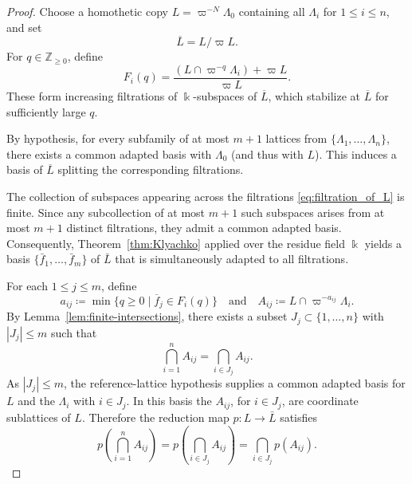 \documentclass[12pt]{amsart}
\theoremstyle{definition}
\theoremstyle{remark}
\newcommand{\Z}{\mathbb{Z}}
\def \Z{\mathbb{Z}}
\begin{document}
\begin{proof}%
Choose a homothetic copy $L = \varpi^{-N}\Lambda_0$ containing all $\Lambda_i$ for $1 \le i \le n$, and set $$\overline L = L/\varpi L.$$ For $q \in \Z_{\geq 0}$, define
\begin{equation}
    \label{eq:filtration_of_L}
    F_i(q) = \frac{(L \cap \varpi^{-q}\Lambda_i) + \varpi L}{\varpi L}.
\end{equation}
These form increasing filtrations of $\Bbbk$-subspaces of $\overline L$, which stabilize at $\overline L$ for sufficiently large $q$.

By hypothesis, for every subfamily of at most $m+1$ lattices from $\{\Lambda_1, \dots, \Lambda_n\}$, there exists a common adapted basis with $\Lambda_0$ (and thus with $L$). This induces a basis of $\overline L$ splitting the corresponding filtrations. 

The collection of subspaces appearing across the filtrations \eqref{eq:filtration_of_L} is finite. Since any subcollection of at most $m+1$ such subspaces arises from at most $m+1$ distinct filtrations, they admit a common adapted basis. Consequently, Theorem~\ref{thm:Klyachko} applied over the residue field $\Bbbk$ yields a basis $\{\bar{f}_1, \dots, \bar{f}_m\}$ of $\bar{L}$ that is simultaneously adapted to all filtrations.

For each $1 \le j \le m$, define
\[
    a_{ij} \coloneqq \min\{q \geq 0 \mid \overline f_j \in F_i(q)\} \quad \text{and} \quad A_{ij} \coloneqq L \cap \varpi^{-a_{ij}}\Lambda_i.
\]
By Lemma~\ref{lem:finite-intersections}, there exists a subset $J_j \subset \{1, \dots, n\}$ with $|J_j| \leq m$ such that
\[
    \bigcap\limits_{i=1}^n A_{ij} = \bigcap\limits_{i\in J_j} A_{ij}.
\]
As $|J_j| \leq m$, the reference-lattice hypothesis supplies a common adapted basis for $L$ and the $\Lambda_i$ with $i\in J_j$. In this basis the $A_{ij}$, for $i\in J_j$, are coordinate
sublattices of $L$. Therefore the reduction map
$p:L\to\bar L$ satisfies
\begin{equation}
\label{eq:proj_intersection_commute}
  p\left(\bigcap\limits_{i=1}^n A_{ij}\right)
  =p\left(\bigcap\limits_{i\in J_j}A_{ij}\right)
  =\bigcap\limits_{i\in J_j}p(A_{ij}).
\end{equation}


\end{proof}
\end{document}
